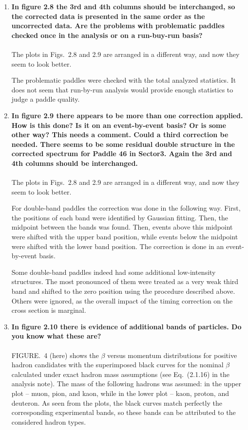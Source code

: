 \documentclass[,superscriptaddress,showpacs,amssymb,amsmath,amsfonts,linenumbers,article]{revtex4-1}
\begin{document}
\begin{enumerate}[label=\textbf{\arabic*}.]


\item {\bf In figure 2.8 the 3rd and 4th columns should be interchanged, so the corrected data is presented in the same order as the uncorrected data. Are the problems with problematic paddles checked once in the analysis or on a run-buy-run basis?}\\ \\
The plots in Figs.~2.8 and 2.9 are arranged in a different way, and now they seem to look better. 

The problematic paddles were checked with the total analyzed statistics. It does not seem that run-by-run analysis would provide enough statistics to judge a paddle quality.

\item {\bf In figure 2.9 there appears to be more than one correction applied. How is this done? Is it on an event-by-event basis? Or is some other way? This needs a comment. Could a third correction be needed. There seems to be some residual double structure in the corrected spectrum for Paddle 46 in Sector3. Again the 3rd and 4th columns should be interchanged.}\\ \\
The plots in Figs.~2.8 and 2.9 are arranged in a different way, and now they seem to look better. 

For double-band paddles the correction was done in the following way. First, the positions of each band were identified by Gaussian fitting. Then, the midpoint between the bands was found. Then, events above this midpoint were shifted with the upper band position, while events below the midpoint were shifted with the lower band position. The correction is done in an event-by-event basis.

Some double-band paddles indeed had some additional low-intensity structures. The most pronounced of them were treated as a very weak third band and shifted to the zero position using the procedure described above. Others were ignored, as the overall impact of the timing correction on the cross section is marginal.

\item {\bf In figure 2.10 there is evidence of additional bands of particles. Do you know what these are?} \\ \\
FIGURE.~4 (here) shows the $\beta$ versus momentum distributions for positive hadron candidates with the superimposed black curves for the nominal $\beta$ calculated under exact hadron mass assumptions (see Eq.~(2.1.16) in the analysis note). The mass of the following hadrons was assumed: in the upper plot -- muon, pion, and kaon, while in the lower plot -- kaon, proton, and deuteron. As seen from the plots, the black curves match perfectly the corresponding experimental bands, so these bands can be attributed to the considered hadron types.


\end{enumerate}
\end{document}

